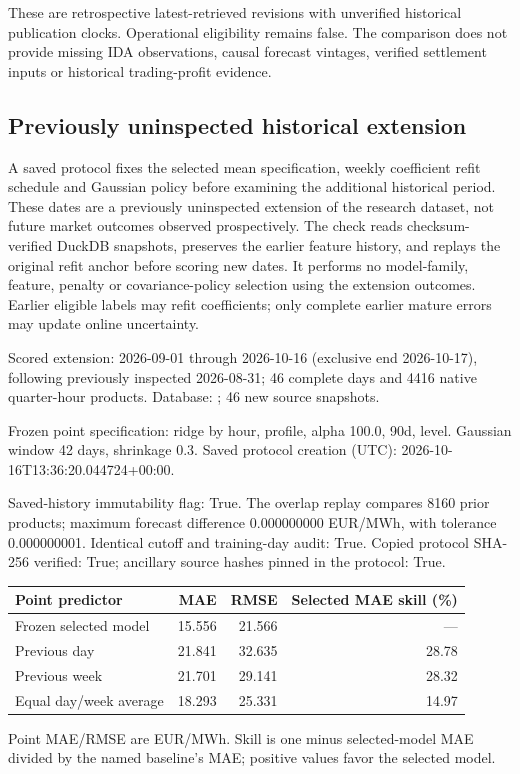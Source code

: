 \documentclass[11pt,a4paper]{article}
\begin{document}
These are retrospective latest-retrieved revisions with unverified historical publication clocks. Operational eligibility remains false. The comparison does not provide missing IDA observations, causal forecast vintages, verified settlement inputs or historical trading-profit evidence.
\subsection{Previously uninspected historical extension}

A saved protocol fixes the selected mean specification, weekly coefficient refit schedule and Gaussian policy before examining the additional historical period. These dates are a previously uninspected extension of the research dataset, not future market outcomes observed prospectively. The check reads checksum-verified DuckDB snapshots, preserves the earlier feature history, and replays the original refit anchor before scoring new dates. It performs no model-family, feature, penalty or covariance-policy selection using the extension outcomes. Earlier eligible labels may refit coefficients; only complete earlier mature errors may update online uncertainty.

Scored extension: 2026-09-01 through 2026-10-16 (exclusive end 2026-10-17), following previously inspected 2026-08-31; 46 complete days and 4416 native quarter-hour products. Database: ; 46 new source snapshots.

Frozen point specification: ridge by hour, profile, alpha 100.0, 90d, level. Gaussian window 42 days, shrinkage 0.3. Saved protocol creation (UTC): 2026-10-16T13:36:20.044724+00:00.

Saved-history immutability flag: True. The overlap replay compares 8160 prior products; maximum forecast difference 0.000000000 EUR/MWh, with tolerance 0.000000001. Identical cutoff and training-day audit: True. Copied protocol SHA-256 verified: True; ancillary source hashes pinned in the protocol: True.

{\small\begin{longtable}{lrrr}
\toprule Point predictor & MAE & RMSE & Selected MAE skill (\%) \\ \midrule
\endhead
Frozen selected model & 15.556 & 21.566 & --- \\
Previous day & 21.841 & 32.635 & 28.78 \\
Previous week & 21.701 & 29.141 & 28.32 \\
Equal day/week average & 18.293 & 25.331 & 14.97 \\
\bottomrule\end{longtable}}
Point MAE/RMSE are EUR/MWh. Skill is one minus selected-model MAE divided by the named baseline's MAE; positive values favor the selected model.
\end{document}
